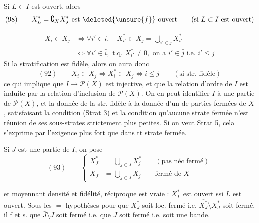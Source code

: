 Si  $L\subset I$ est ouvert,  alors
\[(98)\qquad X_L^*=\complement_X X_J^*\text{ est }\deleted{\unsure{f}}\text{ ouvert}\qquad(\text{si }L\subset I\text{ est ouvert})\]

\[
\begin{aligned}
X_i\subset X_j&\Longleftrightarrow\forall i'\in\bar i,\quad X_{i'}^*\subset X_j=\bigcup_{i'\in\bar j}X_{i'}^*\\
&\Longleftrightarrow\forall i'\in\bar i,\text{ t.q. }X_{i'}^*\neq0,\text{ on a }i'\in\bar j\text{ i.e. }i'\leq j
\end{aligned}
\]
Si la stratification est fidèle, alors on aura donc
\[
(92)\qquad X_i\subset X_j\Longleftrightarrow X_i^*\subset X_j\Longleftrightarrow i\leq j\qquad(\text{si str. fidèle})
\]
ce qui implique que $I\longrightarrow\mathcal P(X)$ est injective, et que la relation d'ordre de $I$ est induite par la relation d'inclusion de $\mathcal P(X)$. On en peut identifier $I$ à une partie de $\mathcal P(X)$, et la donnée de la str. fidèle à la donnée d'un   de parties fermées  de $X$,  satisfaisant la condition (Strat 3)  et la condition qu'aucune strate fermée n'est réunion de ses sous-strates strictement plus petites. Si on veut Strat 5, cela s'exprime par l'exigence plus fort que dans tt strate fermée.

Si $J$ est une partie de $I$, on pose
\[
(93)\qquad\left\{
\begin{aligned}
X_J^*&=\bigcup_{j\in J}X_j^*\qquad(\text{pas néc fermé})\\
X_J&=\bigcup_{j\in J}X_j\qquad\text{fermé de }X
\end{aligned}\right.
\]

et moyennant densité et fidélité,  réciproque est vraie : $X_L^*$ est ouvert \uline{ssi} $L$ est ouvert. Sous les $=$ hypothèses pour que $X_J^*$ soit loc. fermé i.e. $\overline{X_J^*}\setminus X_J^*$  soit fermé,  il f et s. que $\bar J\setminus J$ soit fermé i.e. que $J$ soit  fermé i.e. soit une bande.

